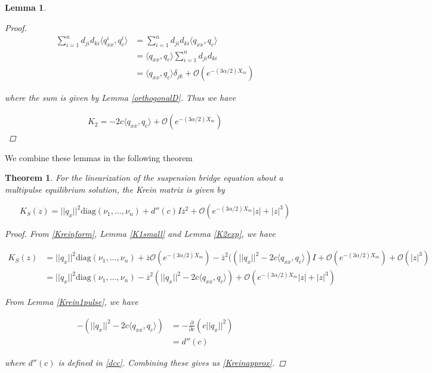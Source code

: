 \documentclass[12pt]{article}
\newtheorem{lemma}{Lemma}
\newtheorem{theorem}{Theorem}
\begin{document}
\begin{lemma}
\begin{proof}
\begin{align*}
\sum_{i = 1}^{n} d_{ji} d_{ki} \langle q^i_{xx}, q^i_c \rangle &= \sum_{i = 1}^{n} d_{ji} d_{ki} \langle q_{xx}, q_c \rangle \\
&= \langle q_{xx}, q_c \rangle \sum_{i = 1}^{n} d_{ji} d_{ki} \\
&= \langle q_{xx}, q_c \rangle \delta_{jk} + \mathcal{O}(e^{-(3 \alpha/2) X_m})
\end{align*}

where the sum is given by Lemma \ref{orthogonalD}. Thus we have

\begin{align*}
K_2 = -2c \langle q_{xx}, q_c \rangle + \mathcal{O}(e^{-(3\alpha /2)X_m})
\end{align*}

\end{proof}
\end{lemma}

We combine these lemmas in the following theorem

\begin{theorem}
For the linearization of the suspension bridge equation about a multipulse equilibrium solution, the Krein matrix is given by

\begin{equation}\label{Kreinapprox}
K_S(z) = ||q_x||^2 \text{diag}(\nu_1, \dots, \nu_n)
 + d''(c) I \overline{z}^2 + \mathcal{O}(e^{-(3 \alpha/2) X_m}|z| + |z|^3)
\end{equation}

\begin{proof}

From \eqref{Kreinform}, Lemma \ref{K1small} and Lemma \ref{K2exp}, we have

\begin{align*}
K_S(z) &= ||q_x||^2 \text{diag}(\nu_1, \dots, \nu_n) + \overline{z} \mathcal{O} (e^{-(3 \alpha/2) X_m})
 - \overline{z}^2 ( (||q_x||^2 - 2c \langle q_{xx}, q_c \rangle)I + \mathcal{O}(e^{-(3 \alpha/2) X_m}) + \mathcal{O}(|z|^3) \\
 &= ||q_x||^2 \text{diag}(\nu_1, \dots, \nu_n) 
 - \overline{z}^2 ( ||q_x||^2 - 2c \langle q_{xx}, q_c \rangle) + \mathcal{O}(e^{-(3 \alpha/2) X_m}|z| + |z|^3)
\end{align*}

From Lemma \ref{Krein1pulse}, we have

\begin{align*}
-\left(||q_x||^2 - 2c \langle q_{xx}, q_c \rangle\right) 
&= -\frac{\partial}{\partial c} \left( c||q_x||^2 \right) \\
&= d''(c)
\end{align*}

where $d''(c)$ is defined in \eqref{dcc}. Combining these gives us \eqref{Kreinapprox}. 

\end{proof}
\end{theorem}
\end{document}
